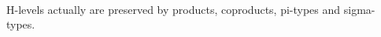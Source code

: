 \begin{code}%
%
\>[2]\<%
\\
\>[2][@{}l@{\AgdaIndent{0}}]%
\>[4]\AgdaSymbol{:}\AgdaSpace{}%
%
\>[9]\AgdaSymbol{\{}\AgdaSpace{}%
\AgdaSymbol{:}\AgdaSpace{}%
\AgdaSpace{}%
\AgdaSymbol{\}}\<%
\\
%
\>[4]\AgdaSpace{}%
\AgdaSymbol{(}\AgdaSpace{}%
\AgdaSymbol{:}\AgdaSpace{}%
\AgdaSpace{}%
\AgdaSpace{}%
\AgdaSpace{}%
\AgdaSymbol{\{}\AgdaSymbol{\})}\<%
\\
%
\>[4]\AgdaSpace{}%
\AgdaSpace{}%
\AgdaSymbol{\{}\AgdaSpace{}%
\AgdaSymbol{\}}\AgdaSpace{}%
\AgdaSpace{}%
\AgdaSpace{}%
\AgdaSymbol{\{}\AgdaSpace{}%
\AgdaSymbol{:}\AgdaSpace{}%
\AgdaSpace{}%
\AgdaSpace{}%
\AgdaSymbol{\}}\<%
\\
%
\>[4]\AgdaSpace{}%
\AgdaSpace{}%
\AgdaSpace{}%
\AgdaSpace{}%
\AgdaFunction{[}\AgdaSpace{}%
\AgdaSymbol{(}\AgdaFunction{\#}\AgdaSpace{}%
\AgdaSpace{}%
\AgdaSymbol{)}\AgdaSpace{}%
\AgdaFunction{/}\AgdaSpace{}%
\AgdaSpace{}%
\AgdaFunction{]}\<%
\\
%
\\[\AgdaEmptyExtraSkip]%
%
\>[2]\AgdaSpace{}%
\AgdaSpace{}%
\AgdaSymbol{\{}\AgdaSymbol{\}}\AgdaSpace{}%
\AgdaSpace{}%
\AgdaSpace{}%
\AgdaSymbol{\{}\AgdaSpace{}%
\AgdaSymbol{=}\AgdaSpace{}%
\AgdaSymbol{\}}\AgdaSpace{}%
\AgdaSymbol{=}\AgdaSpace{}%
\AgdaSpace{}%
\AgdaSymbol{(}\AgdaSpace{}%
\AgdaSymbol{)}\AgdaSpace{}%
\AgdaSpace{}%
\<%
\end{code}

H-levels actually are preserved by products, coproducts, pi-types and sigma-types.

